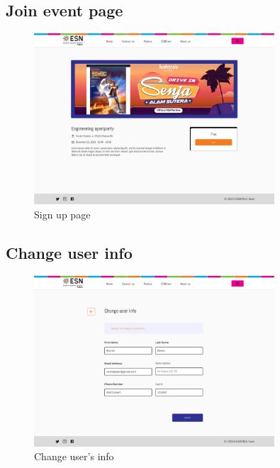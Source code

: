\subsection{Join event page}
\begin{figure}[h!]
    \centering
    \includegraphics[width=0.8\textwidth]{images/JoinEvent.png}
    \caption{Sign up page}
    \label{fig:joinEvent}
\end{figure}
\lipsum[1]
\subsection{Change user info}
\begin{figure}[h!]
    \centering
    \includegraphics[width=0.8\textwidth]{images/ChangeUserDetail.png}
    \caption{Change user's info}
    \label{fig:change info}
\end{figure}
\lipsum[1]

